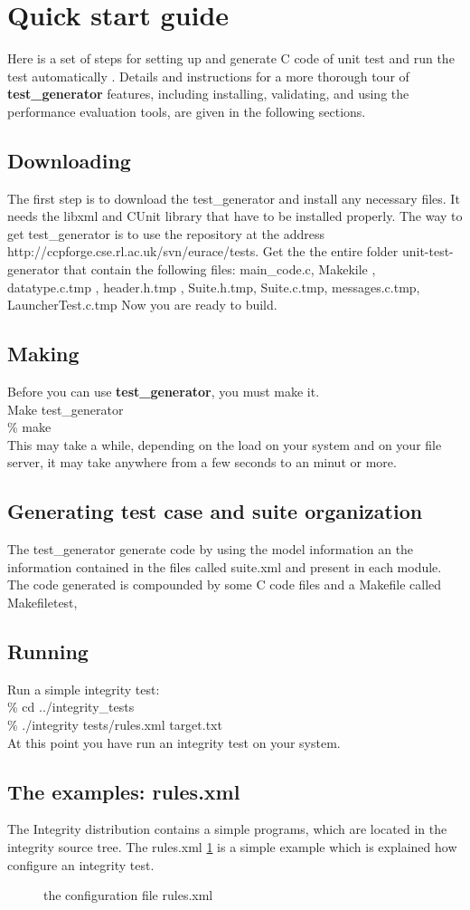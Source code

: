 \documentclass[a4paper,10pt]{article}
\begin{document}
\section{Quick start guide}
Here is a set of steps for setting up and generate C code of unit test and run the test automatically . Details and instructions for
a more thorough tour of \textbf{test\_generator}  features, including installing, validating,
and using the performance evaluation tools, are given in the following sections. 

\subsection{Downloading}
The first step is to download the test\_generator and install any necessary files. 
It needs the  libxml and CUnit library that have to be installed properly.
The  way to get test\_generator is to use the repository at the address  http://ccpforge.cse.rl.ac.uk/svn/eurace/tests. 
Get the the entire folder unit-test-generator that contain the following files:
main\_code.c, Makekile , datatype.c.tmp , header.h.tmp , Suite.h.tmp,
Suite.c.tmp, messages.c.tmp, LauncherTest.c.tmp
Now you are ready to build.
\subsection{Making}
Before you can use \textbf{test\_generator}, you must make it. \\
Make test\_generator\\
\% make \\
This may take a while, depending on the load on your system and on your file server,
it may take anywhere from a few seconds to an minut or more.
\subsection{Generating test case and suite organization}
The test\_generator generate code by using the model information an the information contained in the files called suite.xml and present in each module. 
The code generated is compounded by some C code files and a Makefile called Makefiletest, 
\subsection{Running}
Run a simple integrity test:\\
\% cd ../integrity\_tests\\
\% ./integrity tests/rules.xml target.txt\\
At this point you have run an integrity test on your system. 
\subsection{The examples: rules.xml}
The Integrity distribution contains a simple programs, which are located in the
integrity source tree.
The rules.xml \ref{fig:fig1} is a simple example which is explained how configure an integrity test.
\begin{figure}
\label{fig:fig1}


\caption{the configuration file rules.xml}
\end{figure}
\end{document}
